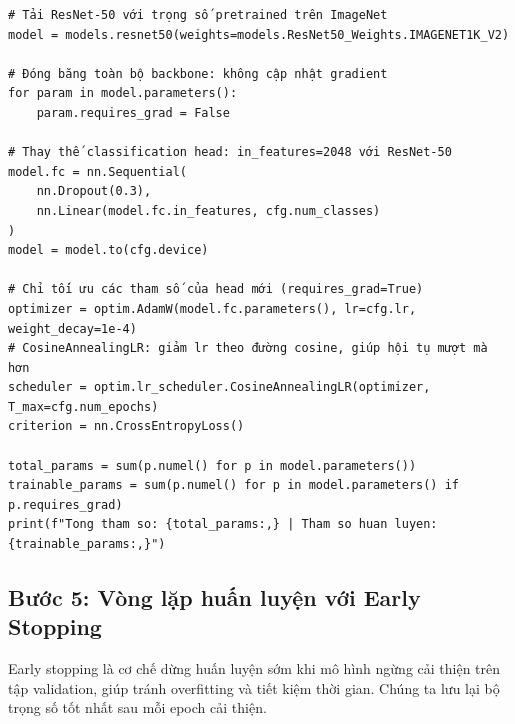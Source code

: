 \begin{verbatim}
# Tải ResNet-50 với trọng số pretrained trên ImageNet
model = models.resnet50(weights=models.ResNet50_Weights.IMAGENET1K_V2)

# Đóng băng toàn bộ backbone: không cập nhật gradient
for param in model.parameters():
    param.requires_grad = False

# Thay thế classification head: in_features=2048 với ResNet-50
model.fc = nn.Sequential(
    nn.Dropout(0.3),
    nn.Linear(model.fc.in_features, cfg.num_classes)
)
model = model.to(cfg.device)

# Chỉ tối ưu các tham số của head mới (requires_grad=True)
optimizer = optim.AdamW(model.fc.parameters(), lr=cfg.lr, weight_decay=1e-4)
# CosineAnnealingLR: giảm lr theo đường cosine, giúp hội tụ mượt mà hơn
scheduler = optim.lr_scheduler.CosineAnnealingLR(optimizer, T_max=cfg.num_epochs)
criterion = nn.CrossEntropyLoss()

total_params = sum(p.numel() for p in model.parameters())
trainable_params = sum(p.numel() for p in model.parameters() if p.requires_grad)
print(f"Tong tham so: {total_params:,} | Tham so huan luyen: {trainable_params:,}")
\end{verbatim}

\subsection{Bước 5: Vòng lặp huấn luyện với Early Stopping}
\label{subsec:cls_training}

Early stopping là cơ chế dừng huấn luyện sớm khi mô hình ngừng cải thiện trên tập validation, giúp tránh overfitting và tiết kiệm thời gian. Chúng ta lưu lại bộ trọng số tốt nhất sau mỗi epoch cải thiện.

